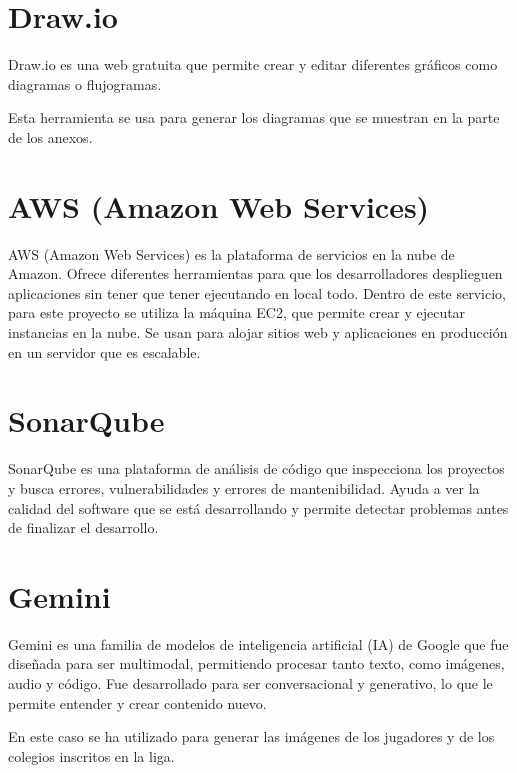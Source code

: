 \section{Draw.io}\label{drawio}

Draw.io es una web gratuita que permite crear y editar diferentes gráficos como diagramas o flujogramas. 

Esta herramienta se usa para generar los diagramas que se muestran en la parte de los anexos.


\section{AWS (Amazon Web Services)}\label{aws}
AWS (Amazon Web Services) es la plataforma de servicios en la nube de Amazon. Ofrece diferentes herramientas para que los desarrolladores desplieguen aplicaciones sin tener que tener ejecutando en local todo. Dentro de este servicio, para este proyecto se utiliza la máquina EC2, que permite crear y ejecutar instancias en la nube. Se usan para alojar sitios web y aplicaciones en producción en un servidor que es escalable.


\section{SonarQube}\label{sonarqube}
SonarQube es una plataforma de análisis de código que inspecciona los proyectos y busca errores, vulnerabilidades y errores de mantenibilidad. Ayuda a ver la calidad del software que se está desarrollando y permite detectar problemas antes de finalizar el desarrollo.


\section{Gemini}\label{gemini}
Gemini es una familia de modelos de inteligencia artificial (IA) de Google que fue diseñada para ser multimodal, permitiendo procesar tanto texto, como imágenes, audio y código. Fue desarrollado para ser conversacional y generativo, lo que le permite entender y crear contenido nuevo.

En este caso se ha utilizado para generar las imágenes de los jugadores y de los colegios inscritos en la liga.

